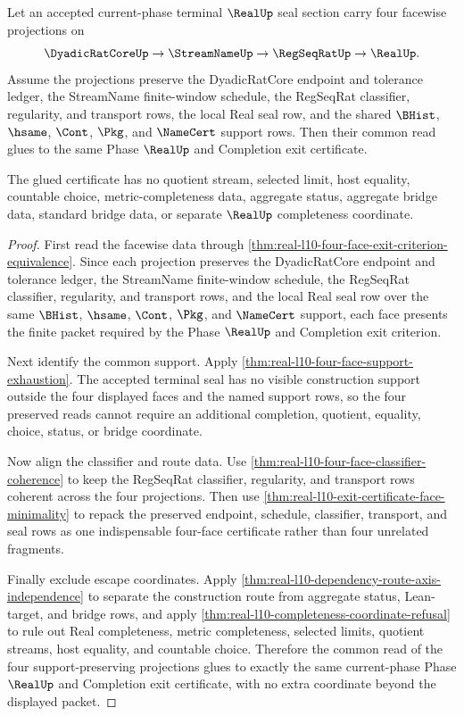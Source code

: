 \begin{theorem}
\label{thm:real-l10-facewise-projection-gluing}
Let an accepted current-phase terminal $\RealUp$ seal section carry four facewise projections on
$$
\DyadicRatCoreUp \to \StreamNameUp \to \RegSeqRatUp \to \RealUp .
$$
Assume the projections preserve the DyadicRatCore endpoint and tolerance ledger, the StreamName finite-window schedule, the RegSeqRat classifier, regularity, and transport rows, the local Real seal row, and the shared $\BHist$, $\hsame$, $\Cont$, $\Pkg$, and $\NameCert$ support rows. Then their common read glues to the same Phase $\RealUp$ and Completion exit certificate.

The glued certificate has no quotient stream, selected limit, host equality, countable choice, metric-completeness data, aggregate status, aggregate bridge data, standard bridge data, or separate $\RealUp$ completeness coordinate.
\end{theorem}
\begin{proof}
First read the facewise data through \autoref{thm:real-l10-four-face-exit-criterion-equivalence}. Since each projection preserves the DyadicRatCore endpoint and tolerance ledger, the StreamName finite-window schedule, the RegSeqRat classifier, regularity, and transport rows, and the local Real seal row over the same $\BHist$, $\hsame$, $\Cont$, $\Pkg$, and $\NameCert$ support, each face presents the finite packet required by the Phase $\RealUp$ and Completion exit criterion.

Next identify the common support. Apply \autoref{thm:real-l10-four-face-support-exhaustion}. The accepted terminal seal has no visible construction support outside the four displayed faces and the named support rows, so the four preserved reads cannot require an additional completion, quotient, equality, choice, status, or bridge coordinate.

Now align the classifier and route data. Use \autoref{thm:real-l10-four-face-classifier-coherence} to keep the RegSeqRat classifier, regularity, and transport rows coherent across the four projections. Then use \autoref{thm:real-l10-exit-certificate-face-minimality} to repack the preserved endpoint, schedule, classifier, transport, and seal rows as one indispensable four-face certificate rather than four unrelated fragments.

Finally exclude escape coordinates. Apply \autoref{thm:real-l10-dependency-route-axis-independence} to separate the construction route from aggregate status, Lean-target, and bridge rows, and apply \autoref{thm:real-l10-completeness-coordinate-refusal} to rule out Real completeness, metric completeness, selected limits, quotient streams, host equality, and countable choice. Therefore the common read of the four support-preserving projections glues to exactly the same current-phase Phase $\RealUp$ and Completion exit certificate, with no extra coordinate beyond the displayed packet.
\end{proof}

